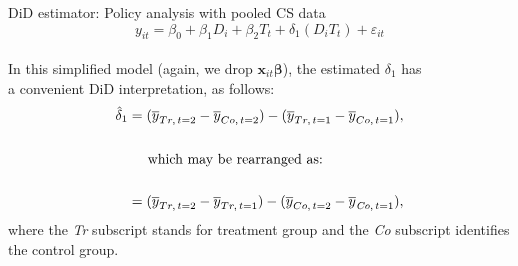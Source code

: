 \documentclass{beamer}
\begin{document}
\begin{frame}{DiD estimator: Policy analysis with pooled CS data}
$$y_{it}=\beta_0 + \beta_1 D_i + \beta_2 T_t + \delta_1 (D_i T_t) + \varepsilon_{it}$$\\
\bigskip
In this simplified model (again, we drop $\bm{x}_{it} \bm{\beta}$), the estimated $\delta_1$ has \\a convenient DiD interpretation, as follows:\\
\bigskip
\begin{align*}
\hat{\delta}_1 &= (\overline{y}_{Tr,\,t=2} - \overline{y}_{Co,\,t=2}) -  (\overline{y}_{Tr,\,t=1} - \overline{y}_{Co,\,t=1}), \\ ~& \\
& \hspace{0.5cm} \textnormal{which may be rearranged as:} \\ ~& \\
&= (\overline{y}_{Tr,\,t=2} - \overline{y}_{Tr,\,t=1}) -  (\overline{y}_{Co,\,t=2} - \overline{y}_{\textit{Co},\,t=1}),
\end{align*}
where the \textit{Tr} subscript stands for treatment group and the \textit{Co} subscript identifies the control group.
\end{frame}
\end{document}
